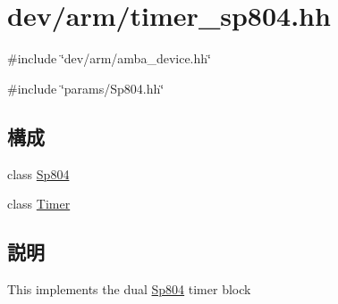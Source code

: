 \hypertarget{timer__sp804_8hh}{
\section{dev/arm/timer\_\-sp804.hh}
\label{timer__sp804_8hh}
}
{\ttfamily \#include \char`\"{}dev/arm/amba\_\-device.hh\char`\"{}}\par
{\ttfamily \#include \char`\"{}params/Sp804.hh\char`\"{}}\par
\subsection*{構成}
\begin{DoxyCompactItemize}
\item 
class \hyperlink{classSp804}{Sp804}
\item 
class \hyperlink{classSp804_1_1Timer}{Timer}
\end{DoxyCompactItemize}


\subsection{説明}
This implements the dual \hyperlink{classSp804}{Sp804} timer block 